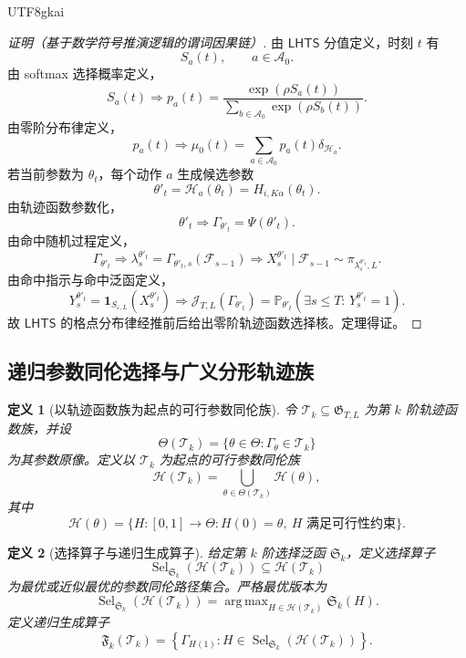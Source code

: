 \documentclass[12pt]{article}
\newtheorem{definition}{定义}[section]
\newcommand{\LHTS}{\ensuremath{\mathsf{LHTS}}}
\newcommand{\Prob}{\mathbb P}
\newcommand{\Fil}{\mathcal F}
\DeclareMathOperator{\Sel}{Sel}
\DeclareMathOperator*{\argmax}{arg\,max}
\begin{document}
\begin{CJK*}{UTF8}{gkai}
\begin{proof}[证明（基于数学符号推演逻辑的谓词因果链）]
由 \(\LHTS{}\) 分值定义，时刻 \(t\) 有
\[
  S_a(t),
  \qquad
  a\in\mathcal A_0.
\]
由 softmax 选择概率定义，
\[
  S_a(t)
  \Longrightarrow
  p_a(t)
  =
  \frac{\exp(\rho S_a(t))}
  {\sum_{b\in\mathcal A_0}\exp(\rho S_b(t))}.
\]
由零阶分布律定义，
\[
  p_a(t)
  \Longrightarrow
  \mu_0(t)
  =
  \sum_{a\in\mathcal A_0}p_a(t)\delta_{\mathscr H_a}.
\]
若当前参数为 \(\theta_t\)，每个动作 \(a\) 生成候选参数
\[
  \theta'_t
  =
  \mathscr H_a(\theta_t)
  =
  H_{i,K\alpha}(\theta_t).
\]
由轨迹函数参数化，
\[
  \theta'_t
  \Longrightarrow
  \Gamma_{\theta'_t}=\Psi(\theta'_t).
\]
由命中随机过程定义，
\[
  \Gamma_{\theta'_t}
  \Longrightarrow
  \lambda_s^{\theta'_t}
  =
  \Gamma_{\theta'_t,s}(\Fil_{s-1})
  \Longrightarrow
  X_s^{\theta'_t}\mid\Fil_{s-1}
  \sim
  \pi_{\lambda_s^{\theta'_t},L}.
\]
由命中指示与命中泛函定义，
\[
  Y_s^{\theta'_t}
  =
  \mathbf 1_{S_{\varepsilon,L}}(X_s^{\theta'_t})
  \Longrightarrow
  \mathcal J_{T,L}(\Gamma_{\theta'_t})
  =
  \Prob_{\theta'_t}
  (\exists s\le T:\,Y_s^{\theta'_t}=1).
\]
故 \(\LHTS{}\) 的格点分布律经推前后给出零阶轨迹函数选择核。定理得证。
\end{proof}

\subsection{递归参数同伦选择与广义分形轨迹族}
\label{subsec:tex57-recursive-fractal-family}

\begin{definition}[以轨迹函数族为起点的可行参数同伦族]
\label{def:tex57-homotopy-family-from-trajectory-set}
令 \(\mathcal T_k\subseteq\mathfrak G_{T,L}\) 为第 \(k\) 阶轨迹函数族，并设
\[
  \Theta(\mathcal T_k)
  =
  \{\theta\in\Theta:\Gamma_\theta\in\mathcal T_k\}
\]
为其参数原像。定义以 \(\mathcal T_k\) 为起点的可行参数同伦族
\[
  \mathcal H(\mathcal T_k)
  =
  \bigcup_{\theta\in\Theta(\mathcal T_k)}
  \mathcal H(\theta),
\]
其中
\[
  \mathcal H(\theta)
  =
  \{H:[0,1]\to\Theta:H(0)=\theta,\ H\text{ 满足可行性约束}\}.
\]
\end{definition}

\begin{definition}[选择算子与递归生成算子]
\label{def:tex57-selection-recursion-operator}
给定第 \(k\) 阶选择泛函 \(\mathfrak S_k\)，定义选择算子
\[
  \Sel_{\mathfrak S_k}(\mathcal H(\mathcal T_k))
  \subseteq
  \mathcal H(\mathcal T_k)
\]
为最优或近似最优的参数同伦路径集合。严格最优版本为
\[
  \Sel_{\mathfrak S_k}(\mathcal H(\mathcal T_k))
  =
  \argmax_{H\in\mathcal H(\mathcal T_k)}
  \mathfrak S_k(H).
\]
定义递归生成算子
\[
  \mathfrak F_k(\mathcal T_k)
  =
  \left\{
  \Gamma_{H(1)}:
  H\in
  \Sel_{\mathfrak S_k}(\mathcal H(\mathcal T_k))
  \right\}.
\]
\end{definition}


\end{CJK*}
\end{document}
